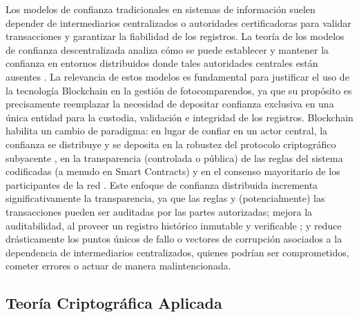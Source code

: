 Los modelos de confianza tradicionales en sistemas de información suelen depender de intermediarios centralizados o autoridades certificadoras para validar transacciones y garantizar la fiabilidad de los registros. La teoría de los modelos de confianza descentralizada analiza cómo se puede establecer y mantener la confianza en entornos distribuidos donde tales autoridades centrales están ausentes \parencite{swan2015blockchain}. La relevancia de estos modelos es fundamental para justificar el uso de la tecnología Blockchain en la gestión de fotocomparendos, ya que su propósito es precisamente reemplazar la necesidad de depositar confianza exclusiva en una única entidad para la custodia, validación e integridad de los registros. Blockchain habilita un cambio de paradigma: en lugar de confiar en un actor central, la confianza se distribuye y se deposita en la robustez del protocolo criptográfico subyacente \parencite{nakamoto2008bitcoin}, en la transparencia (controlada o pública) de las reglas del sistema codificadas (a menudo en Smart Contracts) y en el consenso mayoritario de los participantes de la red \parencite{antonopoulos2023mastering}. Este enfoque de confianza distribuida incrementa significativamente la transparencia, ya que las reglas y (potencialmente) las transacciones pueden ser auditadas por las partes autorizadas; mejora la auditabilidad, al proveer un registro histórico inmutable y verificable \parencite{swan2015blockchain}; y reduce drásticamente los puntos únicos de fallo o vectores de corrupción asociados a la dependencia de intermediarios centralizados, quienes podrían ser comprometidos, cometer errores o actuar de manera malintencionada. 

  

\subsection{Teoría Criptográfica Aplicada} 

